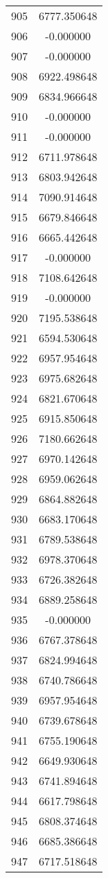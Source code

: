 \documentclass[12pt]{article}
\begin{document}
\begin{longtable}{@{}cc@{}}
905 & 6777.350648 \\
906 & -0.000000 \\
907 & -0.000000 \\
908 & 6922.498648 \\
909 & 6834.966648 \\
910 & -0.000000 \\
911 & -0.000000 \\
912 & 6711.978648 \\
913 & 6803.942648 \\
914 & 7090.914648 \\
915 & 6679.846648 \\
916 & 6665.442648 \\
917 & -0.000000 \\
918 & 7108.642648 \\
919 & -0.000000 \\
920 & 7195.538648 \\
921 & 6594.530648 \\
922 & 6957.954648 \\
923 & 6975.682648 \\
924 & 6821.670648 \\
925 & 6915.850648 \\
926 & 7180.662648 \\
927 & 6970.142648 \\
928 & 6959.062648 \\
929 & 6864.882648 \\
930 & 6683.170648 \\
931 & 6789.538648 \\
932 & 6978.370648 \\
933 & 6726.382648 \\
934 & 6889.258648 \\
935 & -0.000000 \\
936 & 6767.378648 \\
937 & 6824.994648 \\
938 & 6740.786648 \\
939 & 6957.954648 \\
940 & 6739.678648 \\
941 & 6755.190648 \\
942 & 6649.930648 \\
943 & 6741.894648 \\
944 & 6617.798648 \\
945 & 6808.374648 \\
946 & 6685.386648 \\
947 & 6717.518648 \\

\end{longtable}
\end{document}
